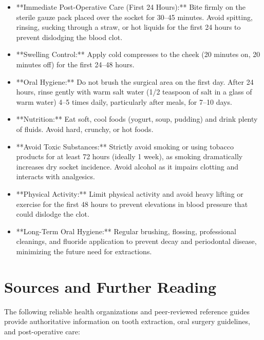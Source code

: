 \begin{itemize}
  \item **Immediate Post-Operative Care (First 24 Hours):** Bite firmly on the sterile gauze pack placed over the socket for 30--45 minutes. Avoid spitting, rinsing, sucking through a straw, or hot liquids for the first 24 hours to prevent dislodging the blood clot.
  \item **Swelling Control:** Apply cold compresses to the cheek (20 minutes on, 20 minutes off) for the first 24--48 hours.
  \item **Oral Hygiene:** Do not brush the surgical area on the first day. After 24 hours, rinse gently with warm salt water (1/2 teaspoon of salt in a glass of warm water) 4--5 times daily, particularly after meals, for 7--10 days.
  \item **Nutrition:** Eat soft, cool foods (yogurt, soup, pudding) and drink plenty of fluids. Avoid hard, crunchy, or hot foods.
  \item **Avoid Toxic Substances:** Strictly avoid smoking or using tobacco products for at least 72 hours (ideally 1 week), as smoking dramatically increases dry socket incidence. Avoid alcohol as it impairs clotting and interacts with analgesics.
  \item **Physical Activity:** Limit physical activity and avoid heavy lifting or exercise for the first 48 hours to prevent elevations in blood pressure that could dislodge the clot.
  \item **Long-Term Oral Hygiene:** Regular brushing, flossing, professional cleanings, and fluoride application to prevent decay and periodontal disease, minimizing the future need for extractions.
\end{itemize}

\section*{Sources and Further Reading}
The following reliable health organizations and peer-reviewed reference guides provide authoritative information on tooth extraction, oral surgery guidelines, and post-operative care:

